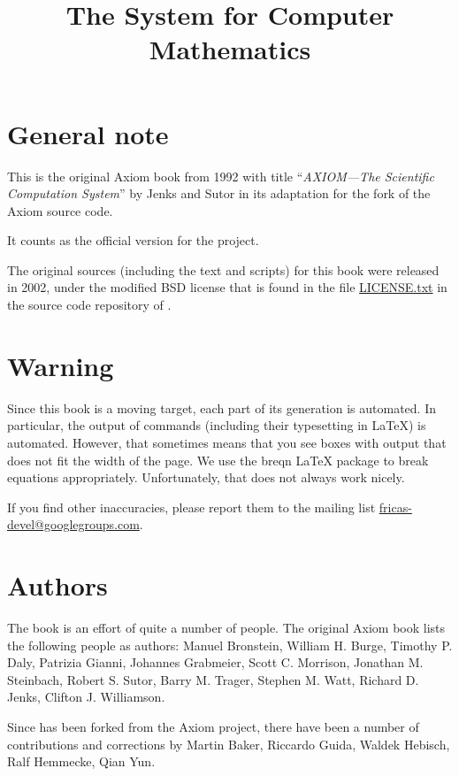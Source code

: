 \documentclass[twoside,a4paper]{book}
\title{The \Language{} System for Computer Mathematics}
\begin{document}
\maketitle
{}%
\setcounter{page}{0}


\section*{General note}
This is the original Axiom book from 1992 with title %
``\emph{AXIOM---The Scientific Computation System}'' by Jenks and
Sutor in its adaptation for the \Language{} fork of the Axiom source
code.

It counts as the official version for the \Language{} project.

The original sources (including the text and scripts) for this book
were released in 2002, under the modified BSD license that is found in
the file
\href{https://github.com/fricas/fricas/blob/master/LICENSE.txt}{LICENSE.txt}
in the source code repository of \Language{}.


\section*{Warning}
Since this book is a moving target, each part of its generation is
automated. In particular, the output of \Language{} commands
(including their typesetting in \LaTeX{}) is automated. However, that
sometimes means that you see boxes with output that does not fit the
width of the page. We use the breqn \LaTeX{} package to break
equations appropriately. Unfortunately, that does not always work
nicely.

If you find other inaccuracies, please report them to the mailing list
\href{mailto:fricas-devel@googlegroups.com}{fricas-devel@googlegroups.com}.

\section*{Authors}

The book is an effort of quite a number of people.
%
The original Axiom book lists the following people as authors:
Manuel Bronstein,
William H. Burge,
Timothy P. Daly,
Patrizia Gianni,
Johannes Grabmeier,
Scott C. Morrison,
Jonathan M. Steinbach,
Robert S. Sutor,
Barry M. Trager,
Stephen M. Watt,
Richard D. Jenks,
Clifton J. Williamson.

Since \Language{} has been forked from the Axiom project, there have
been a number of contributions and corrections by Martin Baker,
Riccardo Guida, Waldek Hebisch, Ralf Hemmecke, Qian Yun.
\end{document}
